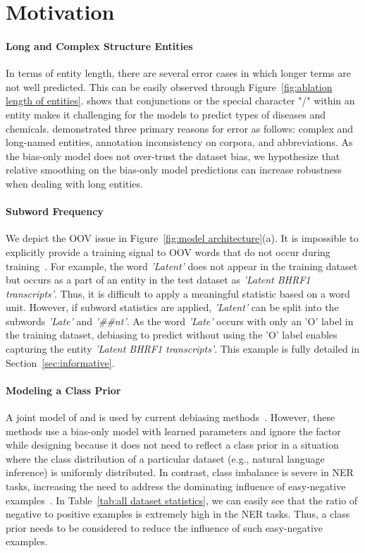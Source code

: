\documentclass[11pt]{article}
\begin{document}
\section{Motivation}

\paragraph{Long and Complex Structure Entities}
\label{sec:longnamed}
In terms of entity length, there are several error cases in which longer terms are not well predicted.
This can be easily observed through Figure~\ref{fig:ablation length of entities}.
\citet{hong2020dtranner} shows that conjunctions or the special character "/" within an entity makes it challenging for the models to predict types of diseases and chemicals.
\citet{wei2020multichannel} demonstrated three primary reasons for error as follows: complex and long-named entities, annotation inconsistency on corpora, and abbreviations.
As the bias-only model does not over-trust the dataset bias, we hypothesize that relative smoothing on the bias-only model predictions can increase robustness when dealing with long entities.

\paragraph{Subword Frequency}
\label{sec:subword}
We depict the OOV issue in Figure~\ref{fig:model architecture}(a).
It is impossible to explicitly provide a training signal to OOV words that do not occur during training~\cite{leevy2018survey, li2020dice}.
For example, the word \textit{'Latent'} does not appear in the training dataset but occurs as a part of an entity in the test dataset as \textit{'Latent BHRF1 transcripts'}. 
Thus, it is difficult to apply a meaningful statistic based on a word unit.
However, if subword statistics are applied, \textit{'Latent'} can be split into the subwords \textit{'Late'} and \textit{'\#\#nt'}.
As the word \textit{'Late'} occurs with only an 'O' label in the training dataset, debiasing to predict without using the 'O' label enables capturing the entity \textit{'Latent BHRF1 transcripts'}.
This example is fully detailed in Section~\ref{sec:informative}.


\paragraph{Modeling a Class Prior}
\label{sec:classprior}
A joint model of  and  is used by current debiasing methods~\cite{clark2019don}.
However, these methods use a bias-only model with learned parameters and ignore the  factor while designing because it does not need to reflect a class prior in a situation where the class distribution of a particular dataset (e.g., natural language inference) is uniformly distributed.
In contrast, class imbalance is severe in NER tasks, increasing the need to address the dominating influence of easy-negative examples~\cite{meng2019dsreg,li2020dice,mahabadi2020end}.
In Table~\ref{tab:all dataset statistics}, we can easily see that the ratio of negative to positive examples is extremely high in the NER tasks.
Thus, a class prior needs to be considered to reduce the influence of such easy-negative examples.
\end{document}
